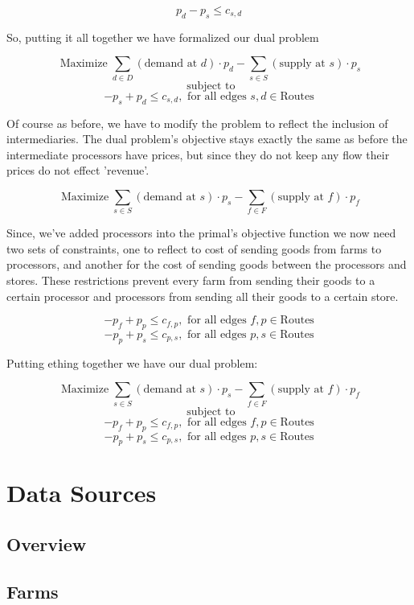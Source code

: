 \documentclass{report}
\begin{document}
$$ p_d -p_s  \leq c_{s,d}$$

So, putting it all together we have formalized our dual problem

$$\operatorname{Maximize} \sum_{d \in D}  (\text{demand at } d) \cdot p_{d} -   \sum_{s \in S}  (\text{supply at } s) \cdot p_{s} $$
$$ \text{ subject to}$$
$$ -p_s + p_d \leq c_{s,d},  \text{ for all edges }  s,d\in \textrm{Routes}$$


Of course as before, we have to modify the problem to reflect the inclusion of intermediaries. The dual problem's objective stays exactly the same as before the intermediate processors have prices, but since they do not keep any flow their prices do not effect 'revenue'.

$$\operatorname{Maximize} \sum_{s \in S}  (\text{demand at } s) \cdot p_{s} -   \sum_{f \in F}  (\text{supply at } f) \cdot p_{f} $$

Since, we've added processors into the primal's objective function we now need two sets of constraints, one to reflect to cost of sending goods from farms to processors, and another for the cost of sending goods between the processors and stores. These restrictions  prevent every farm from sending their goods to a certain processor and processors from sending all their goods to a certain store.

$$ -p_f + p_p \leq c_{f,p}, \text{ for all edges }  f,p\in \textrm{Routes}$$
$$ -p_p + p_s \leq c_{p,s}, \text{ for all edges }  p,s\in \textrm{Routes}$$

Putting ething together we have our dual problem:

$$\operatorname{Maximize} \sum_{s \in S}  (\text{demand at } s) \cdot p_{s} -   \sum_{f \in F}  (\text{supply at } f) \cdot p_{f} $$
$$ \text{ subject to}$$
$$ -p_f + p_p \leq c_{f,p}, \text{ for all edges } f,p\in \textrm{Routes}$$
$$ -p_p + p_s \leq c_{p,s}, \text{ for all edges } p,s\in \textrm{Routes}$$


\chapter{Data Sources}

\section{Overview}

\section{Farms}
\end{document}
